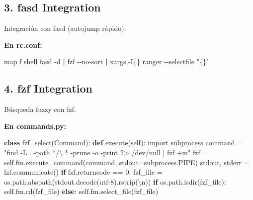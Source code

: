 \documentclass[
  doc,
  floatsintext,
  longtable,
  a4paper,
  nolmodern,
  notxfonts,
  notimes,
  12pt,
  colorlinks=true,linkcolor=blue,citecolor=blue,urlcolor=blue]{apa7}
\newenvironment{Shaded}{\begin{snugshade}}{\end{snugshade}}
\newcommand{\AttributeTok}[1]{\textcolor[rgb]{0.40,0.45,0.13}{#1}}
\newcommand{\CharTok}[1]{\textcolor[rgb]{0.13,0.47,0.30}{#1}}
\newcommand{\ControlFlowTok}[1]{\textcolor[rgb]{0.00,0.23,0.31}{\textbf{#1}}}
\newcommand{\DecValTok}[1]{\textcolor[rgb]{0.68,0.00,0.00}{#1}}
\newcommand{\ErrorTok}[1]{\textcolor[rgb]{0.68,0.00,0.00}{#1}}
\newcommand{\ExtensionTok}[1]{\textcolor[rgb]{0.00,0.23,0.31}{#1}}
\newcommand{\FunctionTok}[1]{\textcolor[rgb]{0.28,0.35,0.67}{#1}}
\newcommand{\ImportTok}[1]{\textcolor[rgb]{0.00,0.46,0.62}{#1}}
\newcommand{\KeywordTok}[1]{\textcolor[rgb]{0.00,0.23,0.31}{\textbf{#1}}}
\newcommand{\NormalTok}[1]{\textcolor[rgb]{0.00,0.23,0.31}{#1}}
\newcommand{\OperatorTok}[1]{\textcolor[rgb]{0.37,0.37,0.37}{#1}}
\newcommand{\StringTok}[1]{\textcolor[rgb]{0.13,0.47,0.30}{#1}}
\newcommand{\VariableTok}[1]{\textcolor[rgb]{0.07,0.07,0.07}{#1}}
\begin{document}
\subsection{3. fasd Integration}\label{fasd-integration}

Integración con fasd (autojump rápido).

\textbf{En rc.conf:}

\begin{Shaded}
\begin{Highlighting}[]
\ExtensionTok{map}\NormalTok{ f shell fasd }\AttributeTok{{-}d} \KeywordTok{|} \ExtensionTok{fzf} \AttributeTok{{-}{-}no{-}sort} \KeywordTok{|} \FunctionTok{xargs} \AttributeTok{{-}I\{\}}\NormalTok{ ranger }\AttributeTok{{-}{-}selectfile} \StringTok{"\{\}"}
\end{Highlighting}
\end{Shaded}

\subsection{4. fzf Integration}\label{fzf-integration}

Búsqueda fuzzy con fzf.

\textbf{En commands.py:}

\begin{Shaded}
\begin{Highlighting}[]
\KeywordTok{class}\NormalTok{ fzf\_select(Command):}
    \KeywordTok{def}\NormalTok{ execute(}\VariableTok{self}\NormalTok{):}
        \ImportTok{import}\NormalTok{ subprocess}
\NormalTok{        command }\OperatorTok{=} \StringTok{"find {-}L . {-}path \textquotesingle{}*/}\ErrorTok{\textbackslash{}}\StringTok{.*\textquotesingle{} {-}prune {-}o {-}print 2\textgreater{} /dev/null | fzf +m"}
\NormalTok{        fzf }\OperatorTok{=} \VariableTok{self}\NormalTok{.fm.execute\_command(command, stdout}\OperatorTok{=}\NormalTok{subprocess.PIPE)}
\NormalTok{        stdout, stderr }\OperatorTok{=}\NormalTok{ fzf.communicate()}
        \ControlFlowTok{if}\NormalTok{ fzf.returncode }\OperatorTok{==} \DecValTok{0}\NormalTok{:}
\NormalTok{            fzf\_file }\OperatorTok{=}\NormalTok{ os.path.abspath(stdout.decode(}\StringTok{\textquotesingle{}utf{-}8\textquotesingle{}}\NormalTok{).rstrip(}\StringTok{\textquotesingle{}}\CharTok{\textbackslash{}n}\StringTok{\textquotesingle{}}\NormalTok{))}
            \ControlFlowTok{if}\NormalTok{ os.path.isdir(fzf\_file):}
                \VariableTok{self}\NormalTok{.fm.cd(fzf\_file)}
            \ControlFlowTok{else}\NormalTok{:}
                \VariableTok{self}\NormalTok{.fm.select\_file(fzf\_file)}
\end{Highlighting}
\end{Shaded}
\end{document}
